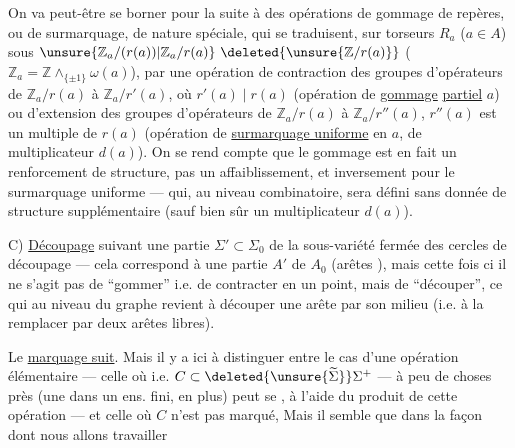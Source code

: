 On va peut-être se borner pour la suite à des opérations de gommage de repères, ou de surmarquage, de nature spéciale, qui se traduisent, sur   torseurs $R_{a}$ ($a\in A$)  sous $\unsure{\mathbb{Z}_{a}/(r(a))|\mathbb{Z}_{a}/r(a)}\ \deleted{\unsure{\mathbb{Z}/r(a)}}$ ($\mathbb{Z}_{a}=\mathbb{Z}\wedge_{\{\pm1\}}\omega(a)$), par une opération de contraction des groupes d'opérateurs de $\mathbb{Z}_{a}/r(a)$ à $\mathbb{Z}_{a}/r'(a)$, où $r'(a)\mid r(a)$ (opération de \uline{gommage} \uline{partiel}   $a$) ou d'extension des groupes d'opérateurs de $\mathbb{Z}_{a}/r(a)$ à $\mathbb{Z}_{a}/r''(a)$,  $r''(a)$  est un multiple de $r(a)$ (opération de \uline{surmarquage uniforme} en $a$, \deleted{\unsure{)}} de multiplicateur $d(a)$). On se rend compte  que le gommage  est en fait un renforcement de structure, pas un affaiblissement, et inversement pour le surmarquage uniforme --- qui, au niveau combinatoire, sera défini sans donnée de structure supplémentaire (sauf bien sûr un multiplicateur $d(a)$).

C) \uline{Découpage}  suivant une partie  $\Sigma'\subset\Sigma_{0}$ de la sous-variété fermée des cercles de découpage --- cela correspond à une partie $A'$ de $A_{0}$ (arêtes ), mais cette fois ci il ne s'agit pas de ``gommer'' i.e. de contracter en un point, mais de ``découper'', ce qui  au niveau du graphe revient à découper une arête par son milieu (i.e. à la remplacer par deux arêtes libres).

Le \uline{marquage suit}.  Mais il y a ici à distinguer entre le cas d'une opération élémentaire  --- celle où   i.e. $C\subset\deleted{\unsure{\widetilde{\Sigma}}}\Sigma^{+}$ ---  à peu de choses près (une  dans un ens. fini, \deleted{\unsure{)}} en plus) peut se , à l'aide du produit de cette opération --- et celle où $C$ n'est pas marqué, Mais il semble que dans la façon dont nous allons travailler
